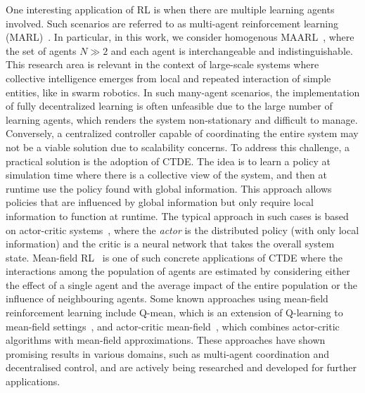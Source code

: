 \documentclass[conference]{IEEEtran}
\begin{document}
One interesting application of \ac{RL} is when there are multiple learning agents involved. 
 Such scenarios are referred to as multi-agent reinforcement learning (MARL)~\cite{zhang2019marl}. 
%
In particular, in this work, we consider homogenous \ac{MAARL}~\cite{yang2021many}, 
 where the set of agents $N \gg 2$ and each agent is interchangeable and indistinguishable.
%
This research area is relevant in the context of large-scale systems 
 where collective intelligence emerges from local and repeated interaction of simple entities, like in swarm robotics.
%
In such many-agent scenarios, 
 the implementation of fully decentralized learning is often unfeasible due to the large number of learning agents, 
 which renders the system non-stationary and difficult to manage. 
%
Conversely, a centralized controller capable of coordinating 
 the entire system may not be a viable solution due to scalability concerns. 
 To address this challenge, a practical solution is the adoption of \ac{CTDE}.
%
The idea is to learn a policy at simulation time where there is a collective view of the system, 
 and then at runtime use the policy found with global information. 
This approach allows policies that are influenced by global information but only require local information to function at runtime. 
%
The typical approach in such cases is based on actor-critic systems~\cite{DBLP:conf/nips/LoweWTHAM17,wu2022more,song2022ctds,song2022centralized},
  where the \emph{actor} is the distributed policy (with only local information) and the critic is a neural network that takes the overall system state.
%
Mean-field RL~\cite{pmlr-v80-yang18d} is one of such concrete applications of \ac{CTDE} 
 where the interactions among the population of agents are estimated by considering either the effect of a single agent and the average impact of the entire population or the influence of neighbouring agents.
%
Some known approaches using mean-field reinforcement learning include Q-mean, 
 which is an extension of Q-learning to mean-field settings~\cite{yang2018mean}, 
 and actor-critic mean-field~\cite{frikha2023actor}, which combines actor-critic algorithms with mean-field approximations. 
%
These approaches have shown promising results in various domains, such as multi-agent coordination 
 and decentralised control, and are actively being researched and developed for further applications.
\end{document}

